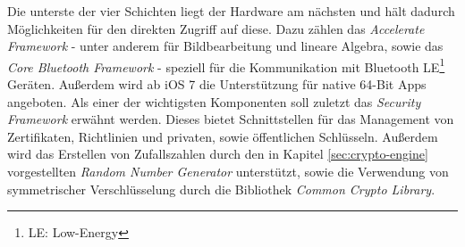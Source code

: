 				Die unterste der vier Schichten liegt der Hardware am nächsten und
				hält dadurch Möglichkeiten für den direkten Zugriff auf diese. Dazu zählen
				das \textsl{Accelerate Framework} - unter anderem für Bildbearbeitung und
				lineare Algebra, sowie das \textsl{Core Bluetooth Framework} - speziell für
				die Kommunikation mit Bluetooth LE\footnote{LE: Low-Energy} Geräten.
				Außerdem wird ab iOS 7 die Unterstützung für native 64-Bit Apps angeboten.
				Als einer der wichtigsten Komponenten soll zuletzt das \textsl{Security
				Framework} erwähnt werden.
				Dieses bietet Schnittstellen für das Management von Zertifikaten, Richtlinien
				und privaten, sowie öffentlichen Schlüsseln. Außerdem wird das Erstellen von
				Zufallszahlen durch den in Kapitel \ref{sec:crypto-engine}
				vorgestellten \textsl{Random Number Generator} unterstützt, sowie die
				Verwendung von symmetrischer Verschlüsselung durch die Bibliothek
				\textsl{Common Crypto Library}.
